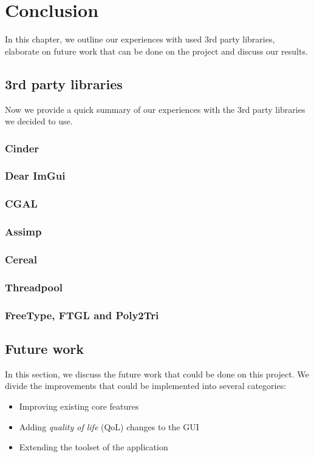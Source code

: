 \chapter{Conclusion}

In this chapter, we outline our experiences with used 3rd party libraries, elaborate on future work that can be done on the project and discuss our results.

\section{3rd party libraries}

Now we provide a quick summary of our experiences with the 3rd party libraries we decided to use.

\subsection{Cinder}
\subsection{Dear ImGui}
\subsection{CGAL}
\subsection{Assimp}
\subsection{Cereal}
\subsection{Threadpool}
\subsection{FreeType, FTGL and Poly2Tri}

\section{Future work}

In this section, we discuss the future work that could be done on this project. We divide the improvements that could be implemented into several categories:

\begin{itemize}
\item Improving existing core features
\item Adding \textit{quality of life} (QoL) changes to the GUI
\item Extending the toolset of the application
\end{itemize}

